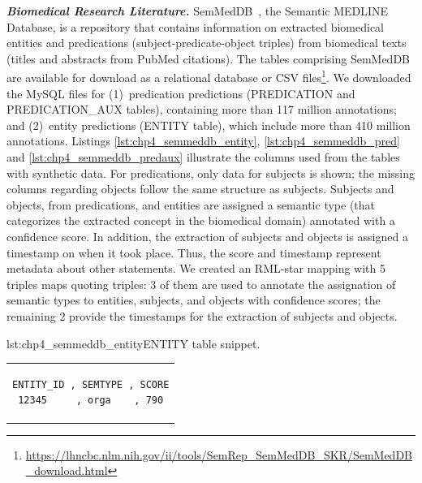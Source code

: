 

\noindent\textbf{\textit{Biomedical Research Literature.}} 
SemMedDB~\citep{SemMedDB}, the Semantic MEDLINE Database, is a repository 
that contains information on extracted biomedical entities 
and predications (subject-predicate-object triples) 
from biomedical texts (titles and abstracts from PubMed citations). 
The tables comprising SemMedDB are available for download as a relational database or CSV files\footnote{ \url{https://lhncbc.nlm.nih.gov/ii/tools/SemRep_SemMedDB_SKR/SemMedDB_download.html}}.
We downloaded the MySQL files for (1)~predication predictions (PREDICATION and PREDICATION\_AUX tables), containing more than 117 million annotations; and (2)~entity predictions (ENTITY table), which include more than 410 million annotations.
Listings \ref{lst:chp4_semmeddb_entity}, \ref{lst:chp4_semmeddb_pred} and \ref{lst:chp4_semmeddb_predaux} illustrate the columns used from the tables with synthetic data. 
For predications, only data for subjects is shown; the missing columns regarding objects follow the same structure as subjects.
Subjects and objects, from predications, and entities are assigned a semantic type 
(that categorizes the extracted concept in the biomedical domain) annotated with a confidence score. 
In addition, the extraction of subjects and objects is assigned a timestamp on when it took place. 
Thus, the score and timestamp represent metadata about other statements.
We created an RML-star mapping with 5 triples maps quoting triples:
3 of them are used to annotate the assignation of semantic types to entities, subjects, and objects with confidence scores;
the remaining 2 provide the timestamps for the extraction of subjects and objects. 

\begin{minipage}{\linewidth}
\begin{captionedlisting}{lst:chp4_semmeddb_entity}{ENTITY table snippet.}
\centering
\begin{tabular}{c}
{
\begin{lstlisting}[basicstyle=\ttfamily\small,label={list:example1},columns=flexible]
ENTITY_ID , SEMTYPE , SCORE
12345     , orga    , 790
\end{lstlisting}
}
\end{tabular}
\end{captionedlisting}
\end{minipage}

